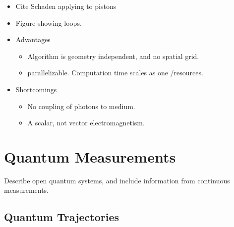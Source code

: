 \begin{itemize}
\item Cite Schaden applying to pistons\cite{Schaden2009}
\item Figure showing loops.  
\item Advantages
  \begin{itemize}
  \item Algorithm is geometry independent, and no spatial grid.
  \item parallelizable.  Computation time scales as one /resources.  
  \end{itemize}

\item Shortcomings
\begin{itemize}
  \item No coupling of photons to medium.
  \item A scalar, not vector electromagnetism.
\end{itemize}
  
\end{itemize}

\section{Quantum Measurements}

Describe open quantum systems, and include information from continuous measurements. 

\subsection{Quantum Trajectories}

